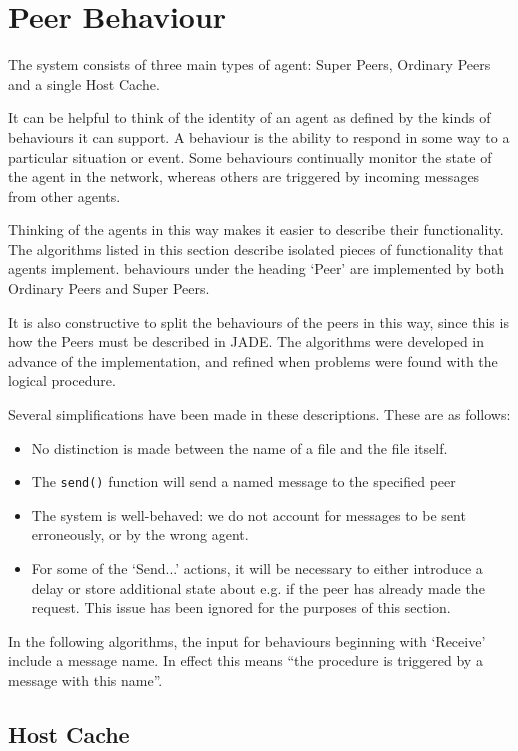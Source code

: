 \section{Peer Behaviour}

\secttoc

The system consists of three main types of agent: Super Peers, Ordinary Peers and a
single Host Cache.

It can be helpful to think of the identity of an agent as defined by the kinds
of behaviours it can support. A behaviour is the ability to respond in some way
to a particular situation or event.  Some behaviours continually monitor the
state of the agent in the network, whereas others are triggered by incoming
messages from other agents.

Thinking of the agents in this way makes it easier to describe their
functionality.  The algorithms listed in this section describe isolated pieces
of functionality that agents implement.  behaviours under the heading `Peer'
are implemented by both Ordinary Peers and Super Peers.

It is also constructive to split the behaviours of the peers in this way, since
this is how the Peers must be described in JADE. The algorithms were developed
in advance of the implementation, and refined when problems were found with the
logical procedure.

Several simplifications have been made in these descriptions.  These are as
follows:

\begin{itemize}
\item{No distinction is made between the name of a file and the file itself.}
\item{The \verb!send()! function will send a named message to the specified
peer}
\item{The system is well-behaved: we do not account for messages to be sent
erroneously, or by the wrong agent.}
\item{For some of the `Send...' actions, it will be necessary to either
introduce a delay or store additional state about e.g. if the peer has already
made the request. This issue has been ignored for the purposes of this
section.}
\end{itemize}

In the following algorithms, the input for behaviours beginning with `Receive'
include a message name.  In effect this means ``the procedure is triggered by a
message with this name''.

\subsection{Host Cache}

